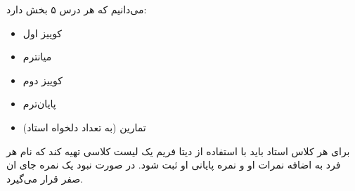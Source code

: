 می‌دانیم که هر درس ۵ بخش دارد:
\begin{itemize}
    \item {کوییز اول}
    \item {میانترم}
    \item {کوییز دوم}
    \item {پایان‌ترم}
    \item {تمارین (به تعداد دلخواه استاد)}
\end{itemize}

برای هر کلاس استاد باید با استفاده از دیتا فریم  یک لیست کلاسی تهیه کند که نام هر فرد به اضافه نمرات او و نمره پایانی او  ثبت شود. در صورت نبود یک نمره جای ان صفر قرار می‌گیرد.